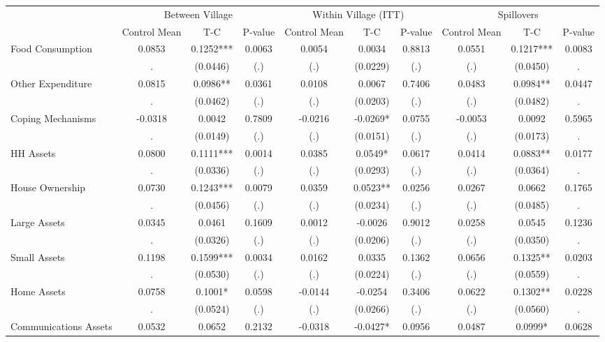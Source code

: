 \begin{tabular}{l*{9}{c}}\hline&\multicolumn{3}{c}{Between Village}&\multicolumn{3}{c}{Within Village (ITT)}&\multicolumn{3}{c}{Spillovers} \\ \cmidrule(r){2-4}\cmidrule(l){5-7}\cmidrule(l){8-10} & {Control Mean} & {T-C} & {P-value} & {Control Mean} & {T-C} & {P-value} & {Control Mean} & {T-C} & {P-value} \\ \midrule  
Food Consumption & 0.0853 & 0.1252*** & 0.0063 & 0.0054 & 0.0034 & 0.8813 & 0.0551 & 0.1217*** & 0.0083 \\
  & . & (0.0446) & (.) & (.) & (0.0229) & (.) & (.) & (0.0450) & . \\
Other Expenditure & 0.0815 & 0.0986** & 0.0361 & 0.0108 & 0.0067 & 0.7406 & 0.0483 & 0.0984** & 0.0447 \\
  & . & (0.0462) & (.) & (.) & (0.0203) & (.) & (.) & (0.0482) & . \\
Coping Mechanisms & -0.0318 & 0.0042 & 0.7809 & -0.0216 & -0.0269* & 0.0755 & -0.0053 & 0.0092 & 0.5965 \\
  & . & (0.0149) & (.) & (.) & (0.0151) & (.) & (.) & (0.0173) & . \\
HH Assets & 0.0800 & 0.1111*** & 0.0014 & 0.0385 & 0.0549* & 0.0617 & 0.0414 & 0.0883** & 0.0177 \\
  & . & (0.0336) & (.) & (.) & (0.0293) & (.) & (.) & (0.0364) & . \\
House Ownership & 0.0730 & 0.1243*** & 0.0079 & 0.0359 & 0.0523** & 0.0256 & 0.0267 & 0.0662 & 0.1765 \\
  & . & (0.0456) & (.) & (.) & (0.0234) & (.) & (.) & (0.0485) & . \\
Large Assets & 0.0345 & 0.0461 & 0.1609 & 0.0012 & -0.0026 & 0.9012 & 0.0258 & 0.0545 & 0.1236 \\
  & . & (0.0326) & (.) & (.) & (0.0206) & (.) & (.) & (0.0350) & . \\
Small Assets & 0.1198 & 0.1599*** & 0.0034 & 0.0162 & 0.0335 & 0.1362 & 0.0656 & 0.1325** & 0.0203 \\
  & . & (0.0530) & (.) & (.) & (0.0224) & (.) & (.) & (0.0559) & . \\
Home Assets & 0.0758 & 0.1001* & 0.0598 & -0.0144 & -0.0254 & 0.3406 & 0.0622 & 0.1302** & 0.0228 \\
  & . & (0.0524) & (.) & (.) & (0.0266) & (.) & (.) & (0.0560) & . \\
Communications Assets & 0.0532 & 0.0652 & 0.2132 & -0.0318 & -0.0427* & 0.0956 & 0.0487 & 0.0999* & 0.0628 \\

\end{tabular}
